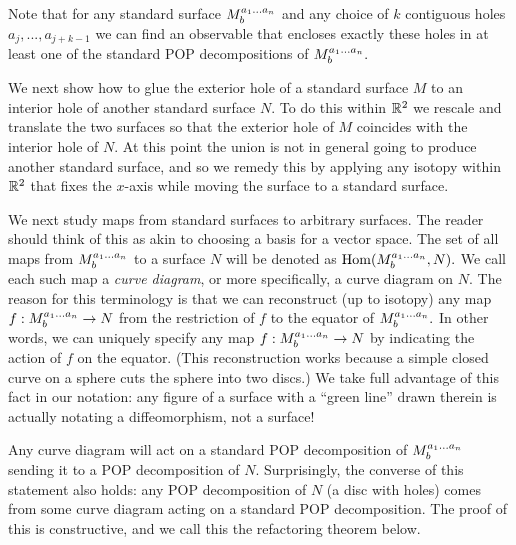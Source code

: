 Note that for any standard surface $M^{a_1...a_n}_{b}$ 
and any choice of $k$ contiguous holes $a_j,...,a_{j+k-1}$
we can find an observable that encloses exactly these holes
in at least one of the standard POP decompositions of $M^{a_1...a_n}_{b}.$ 

We next show how to glue the exterior hole of
a standard surface $M$
to an interior hole of another standard surface $N.$
To do this within $\mathbb{R}^2$ we rescale and translate the two surfaces so
that the exterior hole of $M$ coincides with the interior hole of $N.$
At this point the union is not in general going to
produce another standard surface,
and so we remedy this by applying any isotopy within $\mathbb{R}^2$
that fixes the $x$-axis while moving the surface to a standard surface.

We next study maps from standard surfaces to arbitrary surfaces.
The reader should think of this as akin to choosing a basis
for a vector space.
The set of all maps from $M^{a_1...a_n}_{b}$ 
to a surface $N$ will be denoted as ${\mathrm{Hom}}(M^{a_1...a_n}_{b}, N).$ 
We call each such map a \emph{curve diagram},
or more specifically, a curve diagram on $N$.
The reason for this terminology is that we can reconstruct (up to isotopy)
any map $f:M^{a_1...a_n}_{b}\to N$ from
the restriction of $f$ to the equator of $M^{a_1...a_n}_{b}.$
In other words, we can uniquely specify any map
$f:M^{a_1...a_n}_{b}\to N$ by indicating the action of
$f$ on the equator.
(This reconstruction works because a simple closed curve on a sphere cuts 
the sphere into two discs.)
We take full advantage of this
fact in our notation: any figure of a surface
with a ``green line'' drawn therein is actually notating a 
diffeomorphism, not a surface!

Any curve diagram will act on a standard POP decomposition
of $M^{a_1...a_n}_{b}$ sending it to a POP decomposition of $N.$
Surprisingly, the converse of this statement also holds:
any POP decomposition of $N$ (a disc with holes)
comes from some curve diagram
acting on a standard POP decomposition.
The proof of this is constructive, and we call this
the refactoring theorem below. %

